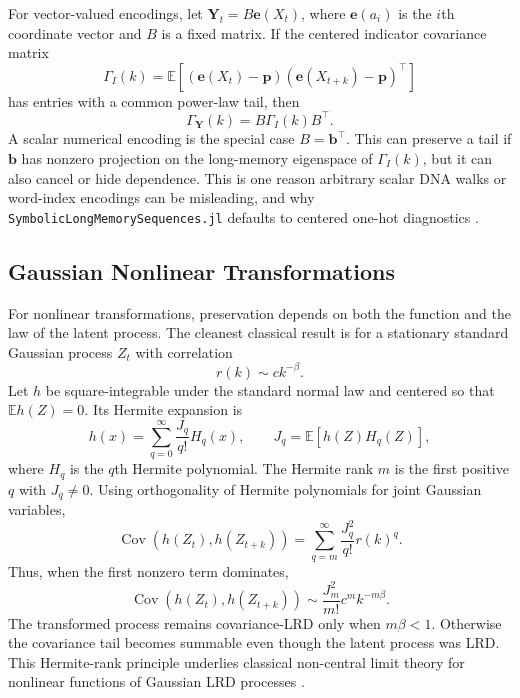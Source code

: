 \documentclass[journal]{IEEEtran}
\newcommand{\pkg}[1]{\texttt{#1}}
\newcommand{\vect}[1]{\boldsymbol{#1}}
\newcommand{\sfive}{\pkg{SymbolicLongMemorySequences.jl}}
\begin{document}
For vector-valued encodings, let \(\vect{Y}_t = B\vect{e}(X_t)\), where
\(\vect{e}(a_i)\) is the
\(i\)th coordinate vector and \(B\) is a fixed matrix. If the centered indicator
covariance matrix
\begin{equation}
  \Gamma_I(k)=
  \mathbb{E}\left[
    (\vect{e}(X_t)-\vect{p})(\vect{e}(X_{t+k})-\vect{p})^\top
  \right]
\end{equation}
has entries with a common power-law tail, then
\begin{equation}
  \Gamma_{\vect{Y}}(k)=B\Gamma_I(k)B^\top.
\end{equation}
A scalar numerical encoding is the special case \(B=\vect{b}^\top\). This can preserve a
tail if \(\vect{b}\) has nonzero projection on the long-memory eigenspace of
\(\Gamma_I(k)\), but it can also cancel or hide dependence. This is one reason
arbitrary scalar DNA walks or word-index encodings can be misleading, and why
\sfive{} defaults to centered one-hot diagnostics \cite{voss1992_evolution}.

\subsection{Gaussian Nonlinear Transformations}

For nonlinear transformations, preservation depends on both the function and the
law of the latent process. The cleanest classical result is for a stationary
standard Gaussian process $Z_t$ with correlation
\begin{equation}
  r(k) \sim c k^{-\beta}.
\end{equation}
Let $h$ be square-integrable under the standard normal law and centered so that
\(\mathbb{E}h(Z)=0\). Its Hermite expansion is
\begin{equation}
  h(x) = \sum_{q=0}^{\infty} \frac{J_q}{q!} H_q(x),
  \qquad
  J_q=\mathbb{E}[h(Z)H_q(Z)],
\end{equation}
where $H_q$ is the $q$th Hermite polynomial. The Hermite rank $m$ is the first
positive $q$ with $J_q\ne0$. Using orthogonality of Hermite polynomials for
joint Gaussian variables,
\begin{equation}
  \operatorname{Cov}(h(Z_t),h(Z_{t+k}))
  =
  \sum_{q=m}^{\infty} \frac{J_q^2}{q!} r(k)^q.
\end{equation}
Thus, when the first nonzero term dominates,
\begin{equation}
  \operatorname{Cov}(h(Z_t),h(Z_{t+k}))
  \sim
  \frac{J_m^2}{m!} c^m k^{-m\beta}.
\end{equation}
The transformed process remains covariance-LRD only when $m\beta<1$.
Otherwise the covariance tail becomes summable even though the latent process
was LRD. This Hermite-rank principle underlies classical non-central limit
theory for nonlinear functions of Gaussian LRD processes
\cite{dobrushin1979_non,taqqu1975_weak,breuer1983_central,arcones1994_limit}.
\end{document}
